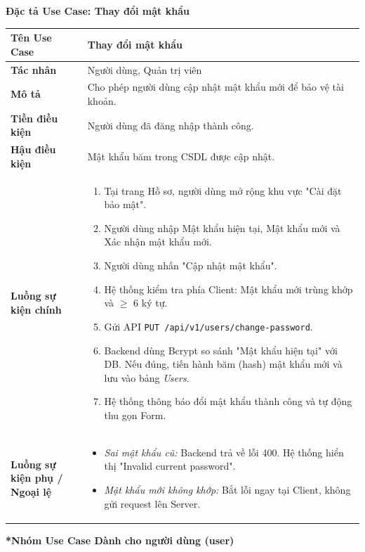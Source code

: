 \documentclass[12pt,a4paper]{article}
\begin{document}
\vspace{0.5cm}
\textbf{Đặc tả Use Case: Thay đổi mật khẩu}

\begin{center}
\renewcommand{\arraystretch}{1.4}
\begin{tabular}{|p{4cm}|p{10cm}|}
\hline
\rowcolor{blue!15}
\textbf{Tên Use Case} & \textbf{Thay đổi mật khẩu} \\ \hline
\textbf{Tác nhân} & Người dùng, Quản trị viên \\ \hline
\textbf{Mô tả} & Cho phép người dùng cập nhật mật khẩu mới để bảo vệ tài khoản. \\ \hline
\textbf{Tiền điều kiện} & Người dùng đã đăng nhập thành công. \\ \hline
\textbf{Hậu điều kiện} & Mật khẩu băm trong CSDL được cập nhật. \\ \hline
\textbf{Luồng sự kiện chính} & 
\begin{enumerate}
    \item Tại trang Hồ sơ, người dùng mở rộng khu vực "Cài đặt bảo mật".
    \item Người dùng nhập Mật khẩu hiện tại, Mật khẩu mới và Xác nhận mật khẩu mới.
    \item Người dùng nhấn "Cập nhật mật khẩu".
    \item Hệ thống kiểm tra phía Client: Mật khẩu mới trùng khớp và $\ge$ 6 ký tự.
    \item Gửi API \texttt{PUT /api/v1/users/change-password}.
    \item Backend dùng Bcrypt so sánh "Mật khẩu hiện tại" với DB. Nếu đúng, tiến hành băm (hash) mật khẩu mới và lưu vào bảng \textit{Users}.
    \item Hệ thống thông báo đổi mật khẩu thành công và tự động thu gọn Form.
\end{enumerate} \\ \hline
\textbf{Luồng sự kiện phụ / Ngoại lệ} & 
\begin{itemize}
    \item \textit{Sai mật khẩu cũ:} Backend trả về lỗi 400. Hệ thống hiển thị "Invalid current password".
    \item \textit{Mật khẩu mới không khớp:} Bắt lỗi ngay tại Client, không gửi request lên Server.
\end{itemize} \\ \hline
\end{tabular}
\end{center}

\textbf{*Nhóm Use Case Dành cho người dùng (user)}
\end{document}
